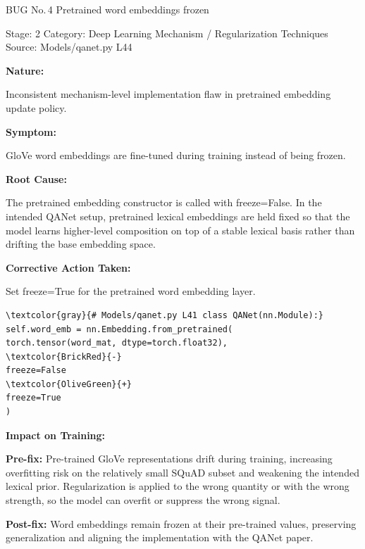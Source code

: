 \documentclass[10pt]{article}
\newcommand{\FieldLabel}[1]{%
 {\bfseries #1:}\par
}
\begin{document}
\begin{bugbox}{BUG No.\,4 \quad Pretrained word embeddings frozen}
{\color{MetaGray}\small Stage: 2 \;\textbar\; Category: Deep Learning Mechanism / Regularization Techniques \;\textbar\; Source: Models/qanet.py L44\par}
\vspace{0.22em}
\FieldLabel{Nature}
Inconsistent mechanism-level implementation flaw in pretrained embedding update policy.
\par
\vspace{0.35em}
\FieldLabel{Symptom}
GloVe word embeddings are fine-tuned during training instead of being frozen.
\par
\vspace{0.35em}
\FieldLabel{Root Cause}
The pretrained embedding constructor is called with freeze=False. In the intended QANet setup, pretrained lexical embeddings are held fixed so that the model learns higher-level composition on top of a stable lexical basis rather than drifting the base embedding space.
\par
\vspace{0.35em}
\FieldLabel{Corrective Action Taken}
Set freeze=True for the pretrained word embedding layer.
\par
\vspace{0.35em}
\begin{Verbatim}[commandchars=\\\{\},fontsize=\footnotesize,breaklines=true,breaksymbol={},frame=leftline,framerule=2pt,rulecolor=\color{gray!40},xleftmargin=6pt,formatcom=\singlespacing]
\textcolor{gray}{# Models/qanet.py L41 class QANet(nn.Module):}
self.word_emb = nn.Embedding.from_pretrained(
torch.tensor(word_mat, dtype=torch.float32),
\textcolor{BrickRed}{-}
freeze=False
\textcolor{OliveGreen}{+}
freeze=True
)
\end{Verbatim}
\vspace{0.22em}
\FieldLabel{Impact on Training}
\textbf{Pre-fix:} Pre-trained GloVe representations drift during training, increasing overfitting risk on the relatively small SQuAD subset and weakening the intended lexical prior. Regularization is applied to the wrong quantity or with the wrong strength, so the model can overfit or suppress the wrong signal. \par\smallskip
\textbf{Post-fix:} Word embeddings remain frozen at their pre-trained values, preserving generalization and aligning the implementation with the QANet paper. 
\par
\vspace{0.35em}
\end{bugbox}
\end{document}
